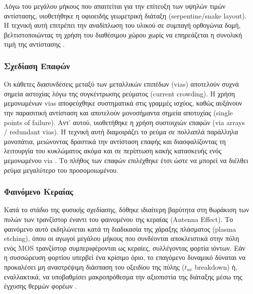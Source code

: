Λόγω του μεγάλου μήκους που απαιτείται για την επίτευξη των υψηλών τιμών αντίστασης, υιοθετήθηκε η οφιοειδής γεωμετρική διάταξη (serpentine/snake layout). Η τεχνική αυτή επιτρέπει την αναδίπλωση του υλικού σε συμπαγή ορθογώνια δομή, βελτιστοποιώντας τη χρήση του διαθέσιμου χώρου χωρίς να επηρεάζεται η συνολική τιμή της αντίστασης \cite{RazaviCMOS}.


\subsubsection{Σχεδίαση Επαφών}

Οι κάθετες διασυνδέσεις μεταξύ των μεταλλικών επιπέδων (vias) αποτελούν συχνά σημεία αστοχίας λόγω της συγκέντρωσης ρεύματος (current crowding). Η χρήση μεμονωμένων vias αποφεύχθηκε συστηματικά στις γραμμές ισχύος, καθώς αυξάνουν την παρασιτική αντίσταση και αποτελούν μονοσήμαντα σημεία αποτυχίας (single points of failure). Αντ' αυτού, υιοθετήθηκε η χρήση συστοιχιών επαφών (via arrays / redundant vias). Η τεχνική αυτή διαμοιράζει το ρεύμα σε πολλαπλά παράλληλα μονοπάτια, μειώνοντας δραστικά την αντίσταση επαφής και διασφαλίζοντας τη λειτουργία του κυκλώματος ακόμα και σε περίπτωση κακής κατασκευής ενός μεμονωμένου via \cite{AlanHasting}. Το πλήθος των επαφών επιλέχθηκε έτσι ώστε να μπορεί να διέλθει ρεύμα μεγαλύτερο του προσομοιωμένου.\par

\subsubsection{Φαινόμενο Κεραίας}
Κατά το στάδιο της φυσικής σχεδίασης, δόθηκε ιδιαίτερη βαρύτητα στη θωράκιση των πυλών των τρανζίστορ έναντι του φαινομένου της κεραίας (Antenna Effect). Το φαινόμενο αυτό εκδηλώνεται κατά τη διαδικασία της χάραξης πλάσματος (plasma etching), όπου οι αγωγοί μεγάλου μήκους που συνδέονται αποκλειστικά στην πύλη ενός MOS τρανζίστορ συμπεριφέρονται ως κεραίες, συλλέγοντας φορτία ιόντων. Εάν η συσσώρευση φορτίου υπερβεί ένα κρίσιμο όριο, το επαγόμενο δυναμικό δύναται να προκαλέσει μη αναστρέψιμη διάσπαση του οξειδίου της πύλης ($t_{ox}$ breakdown) ή, εναλλακτικά, να υποβαθμίσει μακροπρόθεσμα την αξιοπιστία της διάταξης μέσω της έγχυσης θερμών φορέων \cite{AlanHasting}.

